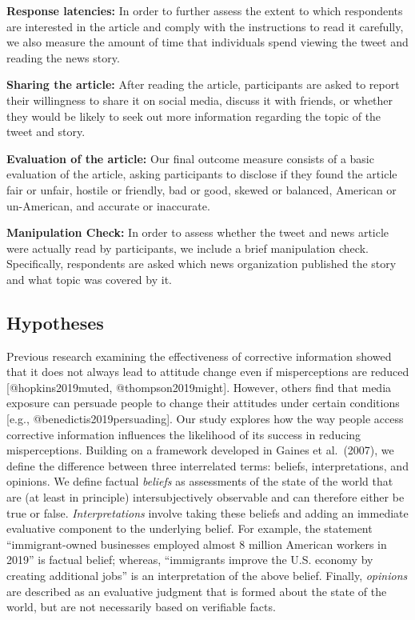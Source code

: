 \documentclass[
]{article}
\begin{document}
\textbf{Response latencies:} In order to further assess the extent to
which respondents are interested in the article and comply with the
instructions to read it carefully, we also measure the amount of time
that individuals spend viewing the tweet and reading the news story.

\textbf{Sharing the article:} After reading the article, participants
are asked to report their willingness to share it on social media,
discuss it with friends, or whether they would be likely to seek out
more information regarding the topic of the tweet and story.

\textbf{Evaluation of the article:} Our final outcome measure consists
of a basic evaluation of the article, asking participants to disclose if
they found the article fair or unfair, hostile or friendly, bad or good,
skewed or balanced, American or un-American, and accurate or inaccurate.

\textbf{Manipulation Check:} In order to assess whether the tweet and
news article were actually read by participants, we include a brief
manipulation check. Specifically, respondents are asked which news
organization published the story and what topic was covered by it.

\hypertarget{hypotheses}{%
\subsection{Hypotheses}\label{hypotheses}}

Previous research examining the effectiveness of corrective information
showed that it does not always lead to attitude change even if
misperceptions are reduced {[}@hopkins2019muted, @thompson2019might{]}.
However, others find that media exposure can persuade people to change
their attitudes under certain conditions {[}e.g.,
@benedictis2019persuading{]}. Our study explores how the way people
access corrective information influences the likelihood of its success
in reducing misperceptions. Building on a framework developed in Gaines
et al.~(2007), we define the difference between three interrelated
terms: beliefs, interpretations, and opinions. We define factual
\emph{beliefs} as assessments of the state of the world that are (at
least in principle) intersubjectively observable and can therefore
either be true or false. \emph{Interpretations} involve taking these
beliefs and adding an immediate evaluative component to the underlying
belief. For example, the statement ``immigrant-owned businesses employed
almost 8 million American workers in 2019'' is factual belief; whereas,
``immigrants improve the U.S. economy by creating additional jobs'' is
an interpretation of the above belief. Finally, \emph{opinions} are
described as an evaluative judgment that is formed about the state of
the world, but are not necessarily based on verifiable facts.
\end{document}

